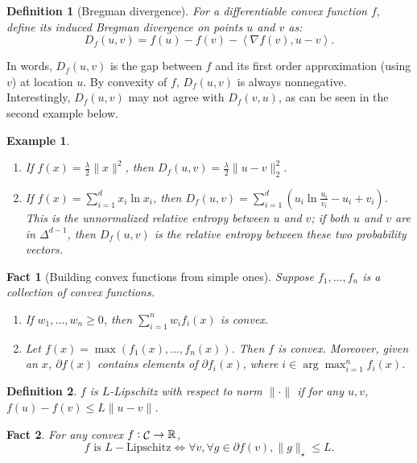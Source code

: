 \documentclass{article}
\newtheorem{example}{Example}
\newtheorem{definition}{Definition}
\newtheorem{fact}{Fact}
\DeclareMathOperator*{\Ccal}{{\cal C}}
\newcommand{\RR}{\mathbb{R}} %
\newcommand{\inner}[2]{\left\langle #1,#2 \right\rangle}
\begin{document}
\begin{definition}[Bregman divergence]
For a differentiable convex function $f$, define its induced Bregman divergence on points $u$ and $v$ as:
\[ D_f(u, v) = f(u) - f(v) - \inner{\nabla f(v)}{u - v}. \]
\end{definition}
In words, $D_f(u, v)$ is the gap between $f$ and its first order approximation (using $v$) at location $u$. By convexity of $f$, $D_f(u, v)$ is always nonnegative. Interestingly, $D_f(u, v)$ may not agree with $D_f(v, u)$, as can be seen in the second example below.

\begin{example}
  \begin{enumerate}
  \item If $f(x) = \frac{\lambda}{2}\|x\|^2$, then $D_f(u, v) = \frac{\lambda}{2}\|u - v\|_2^2$.
  \item If $f(x) = \sum_{i=1}^d x_i \ln x_i$, then $D_f(u, v)= \sum_{i=1}^d (u_i \ln\frac{u_i}{v_i} - u_i + v_i)$. This is the {\em unnormalized relative entropy} between $u$ and $v$; if both $u$ and $v$ are in $\Delta^{d-1}$, then $D_f(u, v)$ is the {\em relative entropy} between these two probability vectors.
\end{enumerate}
\end{example}


\begin{fact}[Building convex functions from simple ones]
Suppose $f_1, \ldots, f_n$ is a collection of convex functions.
\begin{enumerate}
\item If $w_1,\ldots, w_n \geq 0$, then $\sum_{i=1}^n w_i f_i(x)$ is convex.

\item Let $f(x) = \max(f_1(x), \ldots, f_n(x))$. Then $f$ is convex. Moreover, given an $x$,
$\partial f(x)$ contains elements of $\partial f_{i}(x)$, where $i \in \arg\max_{i=1}^n f_i(x)$.
\end{enumerate}
\label{fact:build-cvx}
\end{fact}


\begin{definition}
$f$ is $L$-Lipschitz with respect to norm $\| \cdot \|$ if for any $u, v$, $f(u) - f(v) \leq L\| u - v\|$.
\end{definition}

\begin{fact}
For any convex $f: \Ccal \to \RR$,
\[ f \text{ is } L-\text{Lipschitz} \Leftrightarrow \forall v, \forall g \in \partial f(v), \| g \|_\star \leq L. \]
\end{fact}
\end{document}
